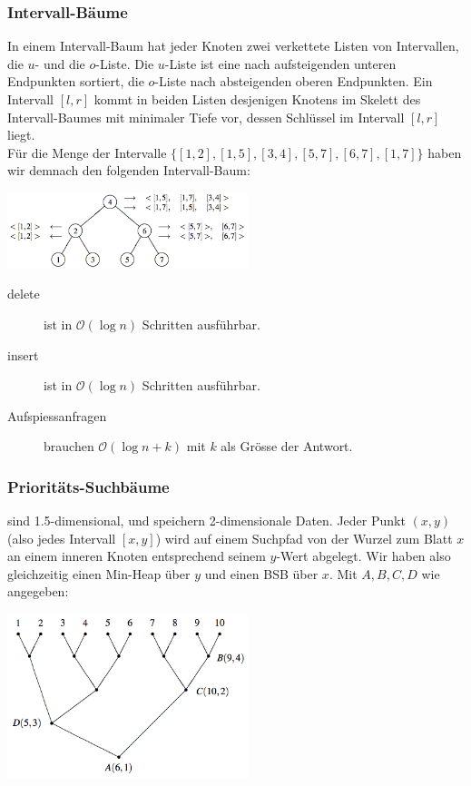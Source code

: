 \documentclass[a4paper, 9pt, DIV=20]{scrartcl}
\newcommand{\Oh}{\mathcal{O}}
\begin{document}
\subsubsection{Intervall-Bäume}
In einem Intervall-Baum hat jeder Knoten zwei verkettete Listen von Intervallen, die $u$- und die $o$-Liste. Die $u$-Liste ist eine nach aufsteigenden unteren Endpunkten sortiert, die $o$-Liste nach absteigenden oberen Endpunkten. Ein Intervall $[l, r]$ kommt in beiden Listen  desjenigen Knotens im Skelett des Intervall-Baumes mit minimaler Tiefe vor, dessen Schlüssel im Intervall $[l,r]$ liegt. \\
Für die Menge der Intervalle $\{[1,2],[1,5],[3,4],[5,7],[6,7],[1,7]\}$ haben wir demnach den folgenden Intervall-Baum:

\begin{center}
\includegraphics[width=7cm]{IntervallBaum}
\end{center}

\begin{description}
\item[delete] ist in $\Oh(\log{n})$ Schritten ausführbar.
\item[insert] ist in $\Oh(\log{n})$ Schritten ausführbar.
\item[Aufspiessanfragen] brauchen $\Oh(\log{n}+k)$ mit $k$ als Grösse der Antwort.	
\end{description}

\subsubsection{Prioritäts-Suchbäume}
sind 1.5-dimensional, und speichern 2-dimensionale Daten. Jeder Punkt $(x,y)$ (also jedes Intervall $[x,y]$) wird auf einem Suchpfad von der Wurzel zum Blatt $x$ an einem inneren Knoten entsprechend seinem $y$-Wert abgelegt. Wir haben also gleichzeitig einen Min-Heap über $y$ und einen BSB über $x$. Mit $A,B,C,D$ wie angegeben:

\begin{center}
\includegraphics[width=7cm]{PrioritaetsSuchBaum}
\end{center}
\end{document}
